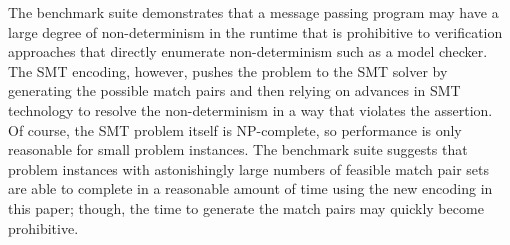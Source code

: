 The benchmark suite demonstrates that a message passing program may
have a large degree of non-determinism in the runtime that is
prohibitive to verification approaches that directly enumerate 
non-determinism such as a model checker. The SMT encoding, however,
pushes the problem to the SMT solver by generating the possible
match pairs and then relying on advances in SMT technology to resolve
the non-determinism in a way that violates the assertion. Of course,
the SMT problem itself is NP-complete, so performance is only
reasonable for small problem instances. The benchmark suite suggests
that problem instances with astonishingly large numbers of feasible
match pair sets are able to complete in a reasonable amount of time
using the new encoding in this paper; though, the time to generate the
match pairs may quickly become prohibitive.
